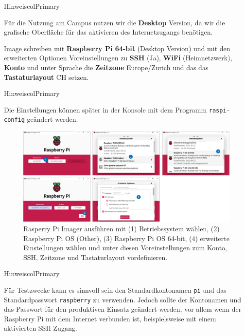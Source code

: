 \documentclass[
  11pt,
  a4paper,
  oneside, openany  ,captions=tableheading
]{scrbook}
\theoremstyle{remark}
\begin{document}
\begin{boxtitle}{Hinweis}{colPrimary}

Für die Nutzung am Campus nutzen wir die \textbf{Desktop} Version, da
wir die grafische Oberfläche für das aktivieren des Internetzugangs
benötigen.

\end{boxtitle}

Image schreiben mit \textbf{Raspberry Pi 64-bit} (Desktop Version) und
mit den erweiterten Optionen Voreinstellungen zu \textbf{SSH} (Ja),
\textbf{WiFi} (Heimnetzwerk), \textbf{Konto} und unter Sprache die
\textbf{Zeitzone} Europe/Zurich und das das \textbf{Tastaturlayout} CH
setzen.

\begin{boxtitle}{Hinweis}{colPrimary}

Die Einstellungen können später in der Konsole mit dem Programm
\texttt{raspi-config} geändert werden.

\end{boxtitle}

\begin{figure}[H]

{\centering \includegraphics{images/raspberry_pi_image_schreiben.png}

}

\caption{Rasperry Pi Imager ausführen mit (1) Betriebssystem wählen, (2)
Raspberry Pi OS (Other), (3) Raspberry Pi OS 64-bit, (4) erweiterte
Einstellungen wählen und unter diesen Voreinstellungen zum Konto, SSH,
Zeitzone und Tastaturlayout vordefinieren.}

\end{figure}%

\begin{boxtitle}{Hinweis}{colPrimary}

Für Testzwecke kann es sinnvoll sein den Standardkontonamen \texttt{pi}
und das Standardpasswort \texttt{raspberry} zu verwenden. Jedoch sollte
der Kontonamen und das Passwort für den produktiven Einsatz geändert
werden, vor allem wenn der Raspberry Pi mit dem Internet verbunden ist,
beispielsweise mit einem aktivierten SSH Zugang.

\end{boxtitle}
\end{document}
